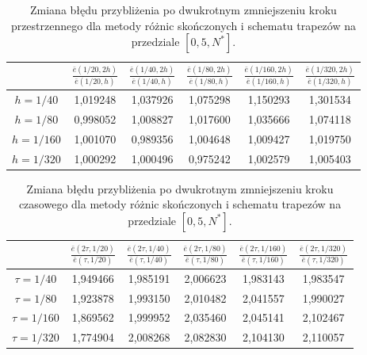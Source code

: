\documentclass{article}
\begin{document}
		\begin{table}[h!]
			\caption{Zmiana błędu przybliżenia po dwukrotnym zmniejszeniu kroku przestrzennego dla metody różnic skończonych i schematu trapezów na przedziale $[0,5, N^{*}]$.}
			\centering
			\begin{tabular}{|c|c|c|c|c|c|}
				\hline
				& $\frac{\bar{e}(1/20,2h)}{\bar{e}(1/20,h)}$ &  $\frac{\bar{e}(1/40,2h)}{\bar{e}(1/40,h)}$ &  $\frac{\bar{e}(1/80,2h)}{\bar{e}(1/80,h)}$ &  $\frac{\bar{e}(1/160,2h)}{\bar{e}(1/160,h)}$ &  $\frac{\bar{e}(1/320,2h)}{\bar{e}(1/320,h)}$ \\
				\hline
				$h=1/40$  &  1,019248 &	1,037926 &	1,075298 &	1,150293 &	1,301534 \\
				\hline
				$h=1/80$  &0,998052 &	1,008827 &	1,017600 &	1,035666 &	1,074118 \\
				\hline
				$h=1/160$ &1,001070 &	0,989356 &	1,004648 &	1,009427 &	1,019750 \\
				\hline
				$h=1/320$ &1,000292 &	1,000496 &	0,975242 &	1,002579 &	1,005403 \\
				\hline
			\end{tabular}
		\end{table}
		\begin{table}[h!]
			\caption{Zmiana błędu przybliżenia po dwukrotnym zmniejszeniu kroku czasowego dla metody różnic skończonych i schematu trapezów na przedziale $[0,5, N^{*}]$.}
			\centering
			\begin{tabular}{|c|c|c|c|c|c|}
				\hline
				& $\frac{\bar{e}(2\tau,1/20)}{\bar{e}(\tau,1/20)}$ &  $\frac{\bar{e}(2\tau,1/40)}{\bar{e}(\tau,1/40)}$ &  $\frac{\bar{e}(2\tau,1/80)}{\bar{e}(\tau,1/80)}$ &  $\frac{\bar{e}(2\tau,1/160)}{\bar{e}(\tau,1/160)}$ &  $\frac{\bar{e}(2\tau,1/320)}{\bar{e}(\tau,1/320)}$ \\
				\hline
				$\tau=1/40$ & 1,949466 &	1,985191 &	2,006623 &	1,983143 &	1,983547 \\
				\hline
				$\tau=1/80$  &1,923878 &	1,993150 &	2,010482 &	2,041557 &	1,990027 \\
				\hline
				$\tau=1/160$ & 1,869562 &	1,999952 &	2,035460 &	2,045141 &	2,102467 \\
				\hline
				$\tau=1/320$ & 1,774904 &	2,008268 &	2,082830 &	2,104130 &	2,110057 \\
				\hline
			\end{tabular}
		\end{table}
\newpage	
\end{document}

